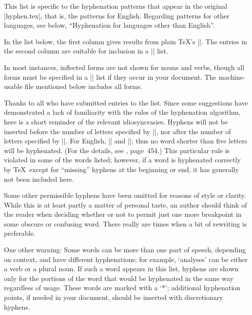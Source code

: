 This list is specific to the hyphenation patterns that appear in
the original |hyphen.tex|, that is, the patterns for  English.
Regarding patterns for other languages, see below, ``Hyphenation for
languages other than  English''.

In the list below, the first column gives results from plain \TeX's
||. The entries in the second column are suitable for
inclusion in a \hbox{||} list.

In most instances, inflected forms are not shown for nouns and verbs,
though all forms must be specified in a || list
if they occur in your document.  The machine-usable file mentioned below
includes all forms.

Thanks to all who have submitted entries to the list.  Since some
suggestions have demonstrated a lack of familiarity with the rules of
the hyphenation algorithm, here is a short reminder of the relevant
idiosyncrasies.  Hyphens will not be inserted before the number of
letters specified by |\lefthyphenmin|, nor after the number of letters
specified by |\righthyphenmin|.  For  English, ||
and ||; thus no word shorter than five
letters will be hyphenated.  (For the details, see \TB, page~454.)
This particular rule is violated in some of the words listed; however,
if a word is hyphenated correctly by \TeX\ except for ``missing''
hyphens at the beginning or end, it has generally not been included here.

Some other permissible hyphens have been omitted
for reasons of style or clarity.  While this is at
least partly a matter of personal taste, an author should think of the
reader when deciding whether or not to permit just one more breakpoint
in some obscure or confusing word.  There really are times when a bit of
rewriting is preferable.
{\hfuzz=2.2pt\par}

One other warning: Some words can be more than one part of speech,
depending on context, and have different hyphenations; for example,
`analyses' can be either a verb or a plural noun.  If such a word appears
in this list, hyphens are shown only for the portions of the word that
would be hyphenated in the same way regardless of usage.  These words
are marked with a `*'; additional hyphenation points, if needed in your
document, should be inserted with discretionary hyphens.

